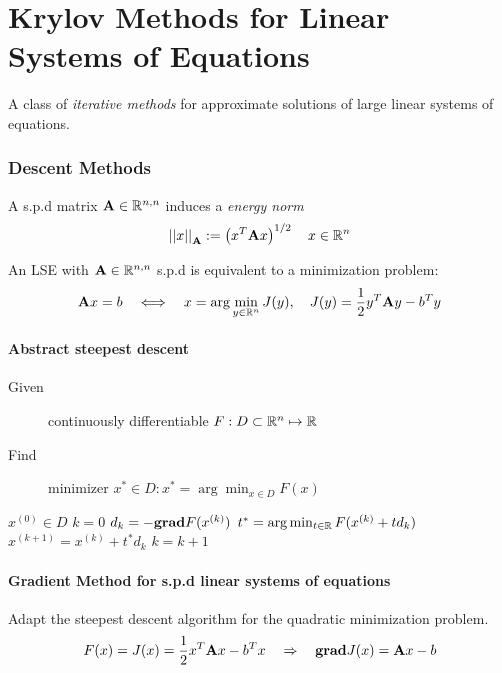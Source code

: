 \part{Krylov Methods for Linear Systems of Equations}
A class of \emph{iterative methods} for approximate solutions of large linear systems of equations.

\section{Descent Methods}
	\begin{definition}
	 A s.p.d matrix $\mathbf A \in \mathbb{R}^{n,n}$ induces a \emph{energy norm}
	 \[
	  \left|\left| x \right|\right|_{\mathbf A} := \left(x^T \mathbf A x\right)^{1/2} \quad x\in\mathbb{R}^n
	 \]
	\end{definition}
	
	\begin{lemma}
	 An LSE with $\mathbf A \in \mathbb{R}^{n,n}$ s.p.d is equivalent to a minimization problem:
	 \[
	  \mathbf{A} x = b \quad \Longleftrightarrow \quad x = \arg \min_{y\in \mathbb{R}^n} J(y), \quad J(y) = \frac{1}{2}y^T \mathbf{A} y - b^T y
	 \]
	\end{lemma}
	\subsection{Abstract steepest descent}
		\begin{description}
		 \item[Given] continuously differentiable $F: D\subset \mathbb{R}^n \mapsto \mathbb{R}$
		 \item[Find] minimizer $x^* \in D: x^* = \arg \min_{x\in D} F(x)$
		\end{description}
		
		\begin{algorithmic}
			\STATE $x^{(0)} \in D$
			\STATE $k = 0$
				\STATE $d_k = -\mathbf{grad} F(x^{(k)})$
				\STATE $t^* = \arg \min_{t\in \mathbb{R}} F(x^{(k)}+t d_k)$
				\STATE $x^{(k+1)} = x^{(k)} + t^* d_k$
				\STATE $k = k+1$
			\ENDWHILE
		\end{algorithmic}
		
	\subsection{Gradient Method for s.p.d linear systems of equations}
		Adapt the steepest descent algorithm for the quadratic minimization problem.
		\[
		 F(x) = J(x) = \frac{1}{2}x^T \mathbf{A} x - b^T x \quad \Rightarrow  \quad \mathbf{grad} J(x) = \mathbf{A}x -b
		\]
	
